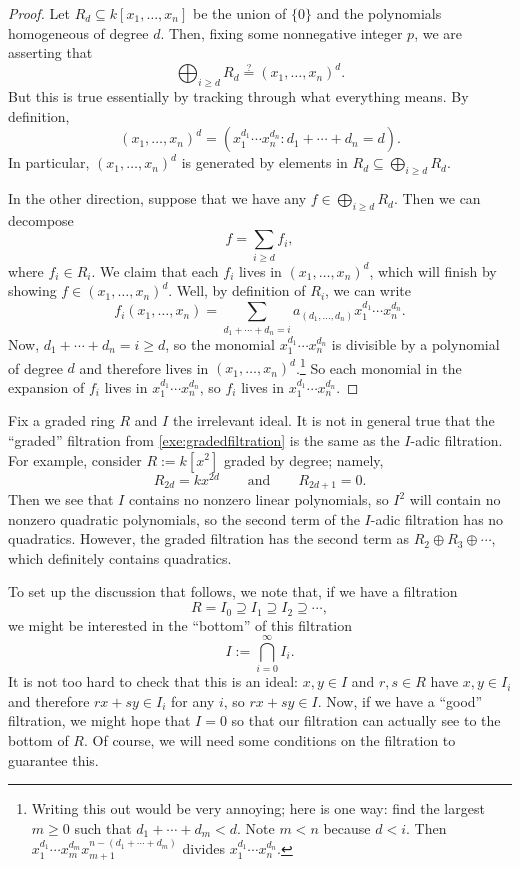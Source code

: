 \begin{proof}
	Let $R_d\subseteq k[x_1,\ldots,x_n]$ be the union of $\{0\}$ and the polynomials homogeneous of degree $d$. Then, fixing some nonnegative integer $p$, we are asserting that
	\[\bigoplus_{i\ge d}R_d\stackrel?=(x_1,\ldots,x_n)^d.\]
	But this is true essentially by tracking through what everything means. By definition,
	\[(x_1,\ldots,x_n)^d=\left(x_1^{d_1}\cdots x_n^{d_n}:d_1+\cdots+d_n=d\right).\]
	In particular, $(x_1,\ldots,x_n)^d$ is generated by elements in $R_d\subseteq\bigoplus_{i\ge d}R_d$.

	In the other direction, suppose that we have any $f\in\bigoplus_{i\ge d}R_d$. Then we can decompose
	\[f=\sum_{i\ge d}f_i,\]
	where $f_i\in R_i$. We claim that each $f_i$ lives in $(x_1,\ldots,x_n)^d$, which will finish by showing $f\in(x_1,\ldots,x_n)^d$. Well, by definition of $R_i$, we can write
	\[f_i(x_1,\ldots,x_n)=\sum_{d_1+\cdots+d_n=i}a_{(d_1,\ldots,d_n)}x_1^{d_1}\cdots x_n^{d_n}.\]
	Now, $d_1+\cdots+d_n=i\ge d$, so the monomial $x_1^{d_1}\cdots x_n^{d_n}$ is divisible by a polynomial of degree $d$ and therefore lives in $(x_1,\ldots,x_n)^d$.\footnote{Writing this out would be very annoying; here is one way: find the largest $m\ge0$ such that $d_1+\cdots+d_m<d$. Note $m<n$ because $d<i$. Then $x_1^{d_1}\cdots x_m^{d_m}x_{m+1}^{n-(d_1+\cdots+d_m)}$ divides $x_1^{d_1}\cdots x_n^{d_n}$.} So each monomial in the expansion of $f_i$ lives in $x_1^{d_1}\cdots x_n^{d_n}$, so $f_i$ lives in $x_1^{d_1}\cdots x_n^{d_n}$.
\end{proof}
\begin{remark}
	Fix a graded ring $R$ and $I$ the irrelevant ideal. It is not in general true that the ``graded'' filtration from \autoref{exe:gradedfiltration} is the same as the $I$-adic filtration. For example, consider $R:=k\left[x^2\right]$ graded by degree; namely,
	\[R_{2d}=kx^{2d}\qquad\text{and}\qquad R_{2d+1}=0.\]
	Then we see that $I$ contains no nonzero linear polynomials, so $I^2$ will contain no nonzero quadratic polynomials, so the second term of the $I$-adic filtration has no quadratics. However, the graded filtration has the second term as $R_2\oplus R_3\oplus\cdots$, which definitely contains quadratics.
\end{remark}
To set up the discussion that follows, we note that, if we have a filtration
\[R=I_0\supseteq I_1\supseteq I_2\supseteq\cdots,\]
we might be interested in the ``bottom'' of this filtration
\[I:=\bigcap_{i=0}^\infty I_i.\]
It is not too hard to check that this is an ideal: $x,y\in I$ and $r,s\in R$ have $x,y\in I_i$ and therefore $rx+sy\in I_i$ for any $i$, so $rx+sy\in I$. Now, if we have a ``good'' filtration, we might hope that $I=0$ so that our filtration can actually see to the bottom of $R$. Of course, we will need some conditions on the filtration to guarantee this.

